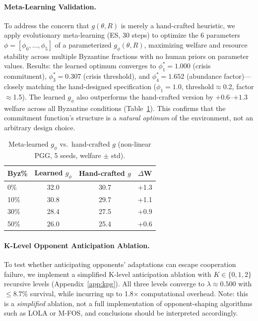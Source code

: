 \documentclass{article}
\begin{document}
\paragraph{Meta-Learning Validation.}
To address the concern that $g(\theta, R)$ is merely a hand-crafted heuristic, we apply evolutionary meta-learning (ES, 30 steps) to optimize the 6 parameters $\phi = [\phi_0, \ldots, \phi_5]$ of a parameterized $g_\phi(\theta, R)$, maximizing welfare and resource stability across multiple Byzantine fractions with no human priors on parameter values.
Results: the learned optimum converges to $\phi_1^* = 1.000$ (crisis commitment), $\phi_3^* = 0.307$ (crisis threshold), and $\phi_4^* = 1.652$ (abundance factor)---closely matching the hand-designed specification ($\phi_1{=}1.0$, threshold$\approx$0.2, factor$\approx$1.5).
The learned $g_\phi$ also outperforms the hand-crafted version by $+0.6$--$+1.3$ welfare across all Byzantine conditions (Table~\ref{tab:meta_learn}).
This confirms that the commitment function's structure is a \emph{natural optimum} of the environment, not an arbitrary design choice.

\begin{table}[t]
\centering
\caption{Meta-learned $g_\phi$ vs.\ hand-crafted $g$ (non-linear PGG, 5 seeds, welfare $\pm$ std).}
\label{tab:meta_learn}
\begin{tabular}{lccc}
\toprule
\textbf{Byz\%} & \textbf{Learned $g_\phi$} & \textbf{Hand-crafted $g$} & \textbf{$\Delta$W} \\
\midrule
0\% & 32.0 & 30.7 & +1.3 \\
10\% & 30.8 & 29.7 & +1.1 \\
30\% & 28.4 & 27.5 & +0.9 \\
50\% & 26.0 & 25.4 & +0.6 \\
\bottomrule
\end{tabular}
\end{table}

\paragraph{K-Level Opponent Anticipation Ablation.}
To test whether anticipating opponents' adaptations can escape cooperation failure, we implement a simplified K-level anticipation ablation with $K \in \{0, 1, 2\}$ recursive levels (Appendix~\ref{app:kpg}).
All three levels converge to $\lambda \approx 0.500$ with $\leq$8.7\% survival, while incurring up to 1.8$\times$ computational overhead.
Note: this is a \emph{simplified} ablation, not a full implementation of opponent-shaping algorithms such as LOLA or M-FOS, and conclusions should be interpreted accordingly.
\end{document}

